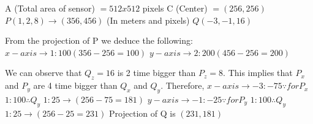 \documentclass[11pt]{article}
\begin{document}
\begin{flushleft}
    A (Total area of sensor) $= 512 x 512$ pixels \newline
    C (Center) $= (256, 256)$ \newline
    $P (1,2,8) \rightarrow (356, 456)$ (In meters and pixels)
    $Q (-3, -1, 16)$
    \newline
    
    From the projection of P we deduce the following: \newline
       $ x-axis \rightarrow 1 : 100 (356 - 256 = 100)$ \newline
       $ y-axis \rightarrow 2 : 200 (456 - 256 = 200)$ \newline

    We can observe that $Q_z = 16$ is 2 time bigger than $P_z = 8$. This implies that $P_x$ and $P_y$ are 4 time bigger than $Q_x$ and $Q_y$.
    \newline \newline
    Therefore, \newline
        $ x-axis \rightarrow -3 : -75 \because for P_x$ $1: 100 \therefore{} Q_y$ $1: 25 \rightarrow (256 - 75 = 181)$ \newline
        $ y-axis \rightarrow -1 : -25 \because for P_y$ $1: 100 \therefore{} Q_y$ $1: 25 \rightarrow (256 - 25 = 231)$ \newline
    \newline 
    Projection of Q is $(231, 181)$

\end{flushleft}
\end{document}
